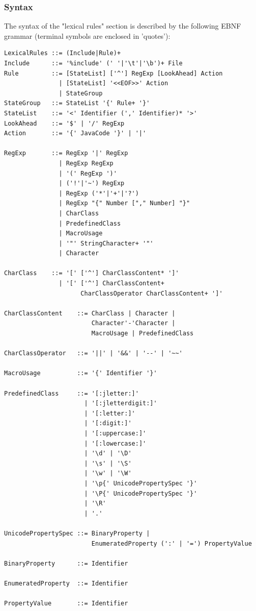\documentclass[11pt]{scrartcl}
\begin{document}
\subsubsection{Syntax\label{Grammar}}
The syntax of the "lexical rules" section is described by the following
EBNF grammar (terminal symbols are enclosed in 'quotes'):

\begin{verbatim}
LexicalRules ::= (Include|Rule)+
Include      ::= '%include' (' '|'\t'|'\b')+ File
Rule         ::= [StateList] ['^'] RegExp [LookAhead] Action 
               | [StateList] '<<EOF>>' Action
               | StateGroup 
StateGroup   ::= StateList '{' Rule+ '}' 
StateList    ::= '<' Identifier (',' Identifier)* '>' 
LookAhead    ::= '$' | '/' RegExp
Action       ::= '{' JavaCode '}' | '|'

RegExp       ::= RegExp '|' RegExp 
               | RegExp RegExp 
               | '(' RegExp ')'
               | ('!'|'~') RegExp
               | RegExp ('*'|'+'|'?')
               | RegExp "{" Number ["," Number] "}" 
               | CharClass
               | PredefinedClass 
               | MacroUsage 
               | '"' StringCharacter+ '"' 
               | Character 

CharClass    ::= '[' ['^'] CharClassContent* ']'
               | '[' ['^'] CharClassContent+ 
                     CharClassOperator CharClassContent+ ']'
                 
CharClassContent    ::= CharClass | Character |
                        Character'-'Character | 
                        MacroUsage | PredefinedClass

CharClassOperator   ::= '||' | '&&' | '--' | '~~'

MacroUsage          ::= '{' Identifier '}'

PredefinedClass     ::= '[:jletter:]' 
                      | '[:jletterdigit:]' 
                      | '[:letter:]' 
                      | '[:digit:]'
                      | '[:uppercase:]' 
                      | '[:lowercase:]'
                      | '\d' | '\D'
                      | '\s' | '\S'
                      | '\w' | '\W'
                      | '\p{' UnicodePropertySpec '}'
                      | '\P{' UnicodePropertySpec '}'
                      | '\R'
                      | '.'          
                            
UnicodePropertySpec ::= BinaryProperty | 
                        EnumeratedProperty (':' | '=') PropertyValue

BinaryProperty      ::= Identifier

EnumeratedProperty  ::= Identifier

PropertyValue       ::= Identifier
\end{verbatim}
\end{document}
